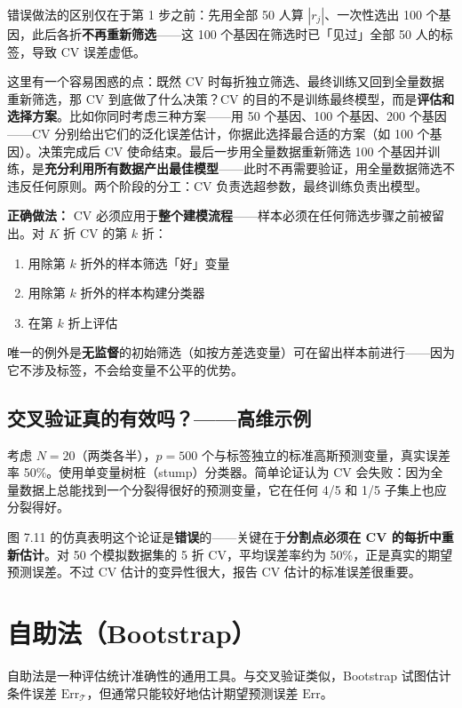 错误做法的区别仅在于第 1 步之前：先用全部 50 人算 $|r_j|$、一次性选出 100 个基因，此后各折\textbf{不再重新筛选}——这 100 个基因在筛选时已「见过」全部 50 人的标签，导致 CV 误差虚低。

这里有一个容易困惑的点：既然 CV 时每折独立筛选、最终训练又回到全量数据重新筛选，那 CV 到底做了什么决策？CV 的目的不是训练最终模型，而是\textbf{评估和选择方案}。比如你同时考虑三种方案——用 50 个基因、100 个基因、200 个基因——CV 分别给出它们的泛化误差估计，你据此选择最合适的方案（如 100 个基因）。决策完成后 CV 使命结束。最后一步用全量数据重新筛选 100 个基因并训练，是\textbf{充分利用所有数据产出最佳模型}——此时不再需要验证，用全量数据筛选不违反任何原则。两个阶段的分工：CV 负责选超参数，最终训练负责出模型。

\textbf{正确做法：} CV 必须应用于\textbf{整个建模流程}——样本必须在任何筛选步骤之前被留出。对 $K$ 折 CV 的第 $k$ 折：
\begin{enumerate}
    \item 用除第 $k$ 折外的样本筛选「好」变量
    \item 用除第 $k$ 折外的样本构建分类器
    \item 在第 $k$ 折上评估
\end{enumerate}
唯一的例外是\textbf{无监督}的初始筛选（如按方差选变量）可在留出样本前进行——因为它不涉及标签，不会给变量不公平的优势。

\subsection{交叉验证真的有效吗？——高维示例}

考虑 $N=20$（两类各半），$p=500$ 个与标签独立的标准高斯预测变量，真实误差率 50\%。使用单变量树桩（stump）分类器。简单论证认为 CV 会失败：因为全量数据上总能找到一个分裂得很好的预测变量，它在任何 4/5 和 1/5 子集上也应分裂得好。

图 7.11 的仿真表明这个论证是\textbf{错误}的——关键在于\textbf{分割点必须在 CV 的每折中重新估计}。对 50 个模拟数据集的 5 折 CV，平均误差率约为 50\%，正是真实的期望预测误差。不过 CV 估计的变异性很大，报告 CV 估计的标准误差很重要。

\section{自助法（Bootstrap）}

自助法是一种评估统计准确性的通用工具。与交叉验证类似，Bootstrap 试图估计条件误差 $\mathrm{Err}_{\mathcal{T}}$，但通常只能较好地估计期望预测误差 $\mathrm{Err}$。

